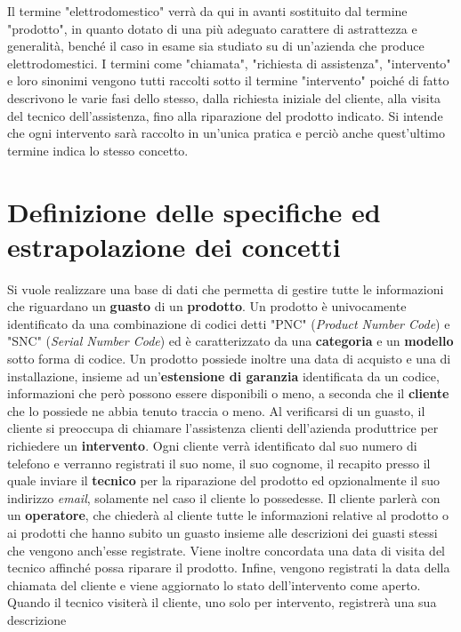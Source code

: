 \documentclass[a4paper, 12pt]{report}
\begin{document}
Il termine "elettrodomestico" verrà da qui in avanti sostituito dal termine "prodotto", in quanto dotato di una più adeguato carattere di astrattezza
e generalità, benché il caso in esame sia studiato su di un'azienda che produce elettrodomestici. I termini come "chiamata", "richiesta di
assistenza", "intervento" e loro sinonimi vengono tutti raccolti sotto il termine "intervento" poiché di fatto descrivono le varie fasi dello
stesso, dalla richiesta iniziale del cliente, alla visita del tecnico dell'assistenza, fino alla riparazione del prodotto indicato. Si intende
che ogni intervento sarà raccolto in un'unica pratica e perciò anche quest'ultimo termine indica lo stesso concetto.

\section{Definizione delle specifiche ed estrapolazione dei concetti}
Si vuole realizzare una base di dati che permetta di gestire tutte le informazioni che riguardano un \textbf{guasto} di un \textbf{prodotto}.
Un prodotto è univocamente identificato da una combinazione di codici detti "PNC" (\textit{Product Number Code}) e "SNC" (\textit{Serial Number Code}) ed è caratterizzato
da una \textbf{categoria} e un \textbf{modello} sotto forma di codice. Un prodotto possiede inoltre una data di acquisto e una di installazione, insieme ad 
un'\textbf{estensione di garanzia} identificata da un codice, informazioni che però possono essere disponibili o meno, a seconda che il \textbf{cliente}
che lo possiede ne abbia tenuto traccia o meno.\newline
Al verificarsi di un guasto, il cliente si preoccupa di chiamare l'assistenza clienti dell'azienda produttrice per richiedere un
\textbf{intervento}. Ogni cliente verrà identificato dal suo numero di telefono e verranno registrati il suo nome, il suo cognome,
il recapito presso il quale inviare il \textbf{tecnico} per la riparazione del prodotto ed opzionalmente il suo indirizzo \textit{email},
solamente nel caso il cliente lo possedesse.\newline
Il cliente parlerà con un \textbf{operatore}, che chiederà al cliente tutte le informazioni relative al prodotto o ai prodotti
che hanno subito un guasto insieme alle descrizioni dei guasti stessi che vengono anch'esse registrate. Viene inoltre concordata una data di
visita del tecnico affinché possa riparare il prodotto. Infine, vengono registrati la data della chiamata del cliente e viene
aggiornato lo stato dell'intervento come aperto. Quando il tecnico visiterà il cliente, uno solo per intervento, registrerà una sua descrizione
\end{document}
